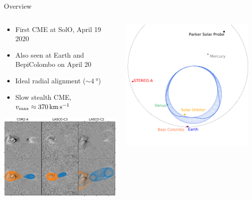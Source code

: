 \documentclass[10pt,aspectratio=169,usenames,dvipsnames]{beamer}
\newcommand{\maxt}{\ensuremath\text{max}}
\begin{document}
\begin{frame}{Overview}
    \begin{columns}
        \begin{column}{0.4\textwidth}
            \begin{itemize}
                \item First CME at SolO, April 19 2020
                \item Also seen at Earth and BepiColombo on April 20
                \item Ideal radial alignment ($\sim\SI{4}{\degree}$)
                \item Slow stealth CME, $v_\maxt \approx \SI{370}{\kilo\meter\per\second}$
            \end{itemize}
            \vspace{2mm}
            \includegraphics[width=\textwidth]{plots/gcs_reconstruction.pdf}
        \end{column}
        \begin{column}{0.5\textwidth}
            \includegraphics[width=\textwidth]{plots/3dcore_visual_davies_new_panela.pdf}

\end{column}
\end{columns}
\end{frame}
\end{document}

